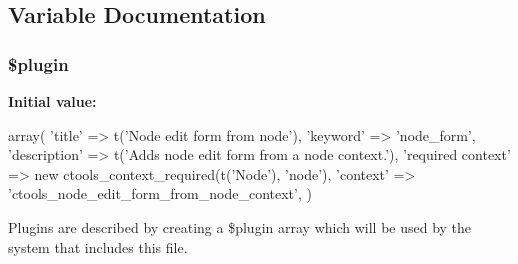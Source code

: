 \subsection{Variable Documentation}
\hypertarget{node__edit__form__from__node_8inc_ada8a7130088351710bb02ed622d6bf65}{
\subsubsection[{\$plugin}]{\setlength{\rightskip}{0pt plus 5cm}\$plugin}}
\label{node__edit__form__from__node_8inc_ada8a7130088351710bb02ed622d6bf65}
{\bfseries Initial value:}
\begin{DoxyCode}
 array(
  'title' => t('Node edit form from node'),
  'keyword' => 'node_form',
  'description' => t('Adds node edit form from a node context.'),
  'required context' => new ctools_context_required(t('Node'), 'node'),
  'context' => 'ctools_node_edit_form_from_node_context',
)
\end{DoxyCode}
Plugins are described by creating a \$plugin array which will be used by the system that includes this file. 